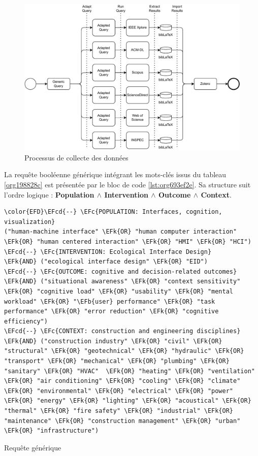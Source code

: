 \documentclass[a4paper,12pt]{article}
\newcommand{\EFc}[1]{\textcolor{EFc}{#1}} %
\newcommand{\EFcd}[1]{\textcolor{EFcd}{#1}} %
\newcommand{\EFk}[1]{\textcolor{EFk}{#1}} %
\newcommand{\EFb}[1]{\textcolor{EFb}{#1}} %
\begin{document}
\begin{figure}[htbp]
\centering
\includegraphics[width=.9\linewidth]{./svg/slr-data-collect.pdf}
\caption{\label{fig:org7aa5d9a}Processus de collecte des données}
\end{figure}

La requête booléenne générique intégrant les mots-clés issus du tableau \ref{org198828c} est présentée par le bloc de code \ref{lst:org693ef2e}. Sa structure suit l’ordre logique : \textbf{Population \(\land\) Intervention \(\land\) Outcome \(\land\) Context}.

\begin{listing}[htbp]
\begin{Code}
\begin{Verbatim}
\color{EFD}\EFcd{--} \EFc{POPULATION: Interfaces, cognition, visualization}
("human-machine interface" \EFk{OR} "human computer interaction" \EFk{OR} "human centered interaction" \EFk{OR} "HMI" \EFk{OR} "HCI")
\EFcd{--} \EFc{INTERVENTION: Ecological Interface Design}
\EFk{AND} ("ecological interface design" \EFk{OR} "EID")
\EFcd{--} \EFc{OUTCOME: cognitive and decision-related outcomes}
\EFk{AND} ("situational awareness" \EFk{OR} "context sensitivity" \EFk{OR} "cognitive load" \EFk{OR} "usability" \EFk{OR} "mental workload" \EFk{OR} "\EFb{user} performance" \EFk{OR} "task performance" \EFk{OR} "error reduction" \EFk{OR} "cognitive efficiency")
\EFcd{--} \EFc{CONTEXT: construction and engineering disciplines}
\EFk{AND} ("construction industry" \EFk{OR} "civil" \EFk{OR} "structural" \EFk{OR} "geotechnical" \EFk{OR} "hydraulic" \EFk{OR} "transport" \EFk{OR} "mechanical" \EFk{OR} "plumbing" \EFk{OR} "sanitary" \EFk{OR} "HVAC"  \EFk{OR} "heating" \EFk{OR} "ventilation" \EFk{OR} "air conditioning" \EFk{OR} "cooling" \EFk{OR} "climate" \EFk{OR} "environmental" \EFk{OR} "electrical" \EFk{OR} "power" \EFk{OR} "energy" \EFk{OR} "lighting" \EFk{OR} "acoustical" \EFk{OR} "thermal" \EFk{OR} "fire safety" \EFk{OR} "industrial" \EFk{OR} "maintenance" \EFk{OR} "construction management" \EFk{OR} "urban" \EFk{OR} "infrastructure")
\end{Verbatim}
\end{Code}
\caption{\label{lst:org693ef2e}Requête générique}
\end{listing}
\end{document}
